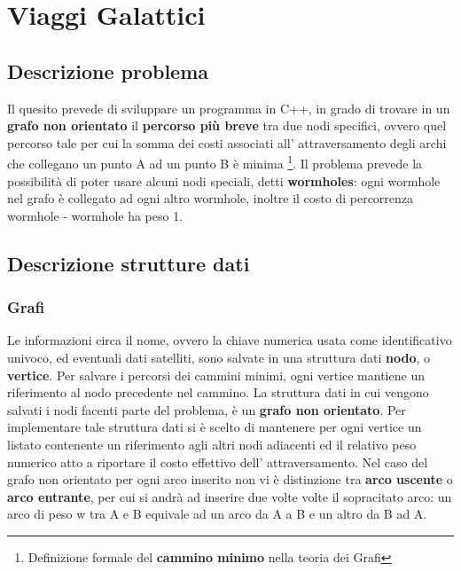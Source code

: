 \def\baselinestretch{1}
\chapter{ Viaggi Galattici }
\def\baselinestretch{1.66}
\thispagestyle{headings}
\section{Descrizione problema}

Il quesito prevede di sviluppare un programma in C++, in grado di trovare in un \textbf{grafo
non orientato} il \textbf{percorso pi\`u breve} tra due nodi
specifici, ovvero quel percorso tale per cui la somma dei
costi associati all' attraversamento degli archi che
collegano un punto A ad un punto B \`e minima \footnote{
Definizione formale del \textbf{cammino minimo} nella teoria
dei Grafi}. Il problema prevede la possibilit\`a
di poter usare alcuni nodi speciali, detti \textbf{wormholes}:
ogni wormhole nel grafo \`e collegato ad ogni altro wormhole,
inoltre il costo di percorrenza wormhole - wormhole ha peso 1.

\section{Descrizione strutture dati}

\subsection{Grafi}
Le informazioni circa il nome, ovvero la chiave numerica usata
come identificativo univoco, ed eventuali dati satelliti, sono
salvate in una struttura dati \textbf{nodo}, o \textbf{vertice}. Per salvare i percorsi dei cammini minimi, ogni vertice mantiene un riferimento al nodo precedente nel cammino.
La struttura dati in cui vengono salvati i nodi facenti parte
del problema, \`e un \textbf{grafo non orientato}. Per implementare
tale struttura dati si \`e scelto di mantenere per ogni
vertice un listato contenente un riferimento agli altri
nodi adiacenti ed il relativo peso numerico atto a riportare
il costo effettivo dell' attraversamento. Nel caso del grafo
non orientato per ogni arco inserito non vi \`e distinzione tra
\textbf{arco uscente} o \textbf{arco entrante}, per cui si andr\`a
ad inserire due volte volte il sopracitato arco: un arco di peso w
tra A e B equivale ad un arco da A a B e un altro da B ad A.

